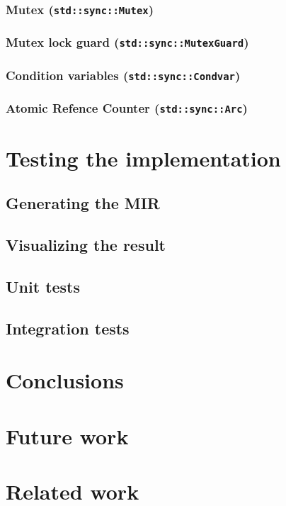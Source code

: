 \documentclass[12pt, oneside]{book}
\begin{document}
\subsection{Mutex (\texttt{std::sync::Mutex})}
\subsection{Mutex lock guard (\texttt{std::sync::MutexGuard})}
\subsection{Condition variables (\texttt{std::sync::Condvar})}
\subsection{Atomic Refence Counter (\texttt{std::sync::Arc})}

\chapter{Testing the implementation}

\section{Generating the MIR}
\section{Visualizing the result}
\section{Unit tests}
\section{Integration tests}
\label{sec:integration-tests}

\chapter{Conclusions}

\chapter{Future work}
\label{chap:future-work}

\chapter{Related work}


\clearpage


\end{document}
